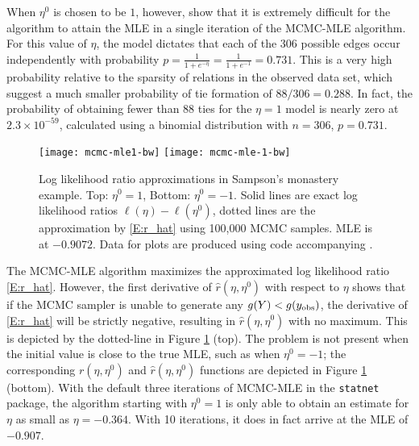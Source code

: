 When $\eta^0$ is chosen to be $1$, however, \citeauthor{ergm} show that it is
extremely difficult for the algorithm to attain the MLE in a single iteration of 
the MCMC-MLE algorithm.  
For this value of $\eta$, the model dictates that each of the 306 possible edges occur independently with probability $p = \frac{1}{1+e^{-\eta}} = \frac{1}{1+e^{-1}} = 0.731$.   
This is a very high probability relative to the sparsity of relations in the observed data 
set, which suggest a much smaller probability of tie formation of $88/306= 0.288$.  
In fact, the probability of obtaining fewer than 88 ties for the $\eta=1$ model is nearly zero at $2.3 \times 10^{-59}$, calculated using a binomial distribution with $n=306$, $p =0.731$.  

\begin{figure}[h!]  
\begin{center} 
{\texttt{[image: mcmc-mle1-bw]}}
{\texttt{[image: mcmc-mle-1-bw]}}
\end{center} 
\caption[Log likelihood ratio approximations in Sampson's monastery example]{Log likelihood ratio approximations in Sampson's monastery example.  Top: $\eta^0 = 1$, Bottom: $\eta^0 = -1$. Solid lines are exact log likelihood ratios $\ell(\eta) - \ell(\eta^0)$, dotted lines are the 
approximation by \eqref{E:r_hat} using 100,000 MCMC samples.  
MLE is at $-0.9072$.
Data for plots are produced using code accompanying \citet{Hummel}.} 
\label{F:MCMC-MLE}
\end{figure} 

The MCMC-MLE algorithm maximizes the approximated log 
likelihood ratio \eqref{E:r_hat}.  However, the first derivative of $\hat{r}(\eta,\eta^0)$ with respect
to $\eta$ shows that if the MCMC sampler is unable to generate any $g(Y)< g(y_{\text{obs}})$, 
the derivative of 
\eqref{E:r_hat} will be strictly negative, resulting in $\hat{r}(\eta,\eta^0)$ with no
maximum.  This is depicted by the dotted-line in Figure \ref{F:MCMC-MLE} (top).  
The problem is not present when the initial value is close to the true MLE, such as 
when $\eta^0 = -1$; the corresponding $r(\eta,\eta^0)$ and $\hat{r}(\eta,\eta^0)$ 
functions are depicted in Figure \ref{F:MCMC-MLE} (bottom).  With the default three 
iterations of MCMC-MLE in the \texttt{statnet} package, the algorithm 
starting with $\eta^0 = 1$ is only able to obtain an estimate for $\eta$ as 
small as $\eta = -0.364$.  With 10 iterations, it does in fact 
arrive at the MLE of $-0.907$.




